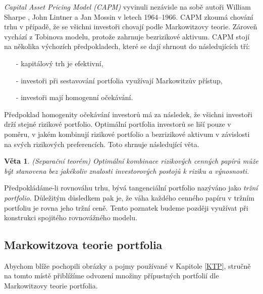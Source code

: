 \documentclass[a4paper,12pt]{report}
\newtheorem{veta}{Věta}
\theoremstyle{definition} \newtheorem{definice}[veta]{Definice}
\theoremstyle{remark}
\begin{document}
\textit{Capital Asset Pricing Model (CAPM)} vyvinuli nezávisle na sobě autoři William Sharpe \cite{sharpe1964}, John Lintner \cite{lintner1965} a Jan Mossin \cite{mossin1966} v letech 1964--1966. CAPM zkoumá chování trhu v případě, že se všichni investoři chovají podle Markowitzovy teorie.
Zároveň vychází z Tobinova modelu, protože zahrnuje bezrizikové aktivum.
CAPM stojí na několika výchozích předpokladech, které se dají shrnout do následujících tří:
\begin{itemize}
\item[-] kapitálový trh je efektivní,
\item[-] investoři při sestavování portfolia využívají Markowitzův přístup,
\item[-] investoři mají homogenní očekávání.
\end{itemize}
Předpoklad homogenity očekávání investorů má za následek, že všichni investoři drží stejné rizikové portfolio.
Optimální portfolia investorů se liší pouze v poměru, v jakém kombinují rizikové portfolio a bezrizikové aktivum v závislosti na svých rizikových preferencích.
Toto shrnuje následující věta.

\begin{veta}(Separační teorém)
Optimální kombinace rizikových cenných papírů může být stanovena bez jakékoliv znalosti investorových postojů k riziku a výnosnosti.
\end{veta}

Předpokládáme-li rovnováhu trhu, bývá tangenciální portfolio nazýváno jako \textit{tržní portfolio}.
Důležitým důsledkem pak je, že váha každého cenného papíru v tržním portfoliu je rovna jeho tržní ceně. \label{vahy_trznihodnota}
Tento poznatek budeme později využívat při konstrukci spojitého rovnovážného modelu.

\subsection{Markowitzova teorie portfolia}\label{Markowitz_kap}
Abychom blíže pochopili obrázky a pojmy používané v Kapitole \ref{KTP}, stručně na tomto místě přiblížíme odvození množiny přípustných portfolií  dle Markowitzovy teorie portfolia.
\end{document}
